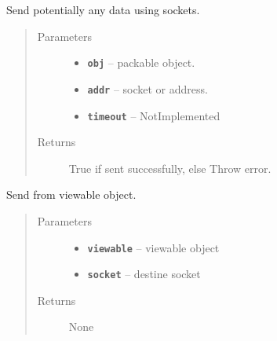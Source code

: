 \documentclass[letterpaper,10pt,english]{sphinxmanual}
\begin{document}
\begin{fulllineitems}
\label{RRtoolbox.lib:RRtoolbox.lib.serverServices.sendPickle}
Send potentially any data using sockets.
\begin{quote}\begin{description}
\item[{Parameters}] \leavevmode\begin{itemize}
\item {} 
\textbf{\texttt{obj}} -- packable object.

\item {} 
\textbf{\texttt{addr}} -- socket or address.

\item {} 
\textbf{\texttt{timeout}} -- NotImplemented

\end{itemize}

\item[{Returns}] \leavevmode
True if sent successfully, else Throw error.

\end{description}\end{quote}

\end{fulllineitems}


\begin{fulllineitems}
\label{RRtoolbox.lib:RRtoolbox.lib.serverServices.send_from}
Send from viewable object.
\begin{quote}\begin{description}
\item[{Parameters}] \leavevmode\begin{itemize}
\item {} 
\textbf{\texttt{viewable}} -- viewable object

\item {} 
\textbf{\texttt{socket}} -- destine socket

\end{itemize}

\item[{Returns}] \leavevmode
None

\end{description}\end{quote}

\end{fulllineitems}
\end{document}
